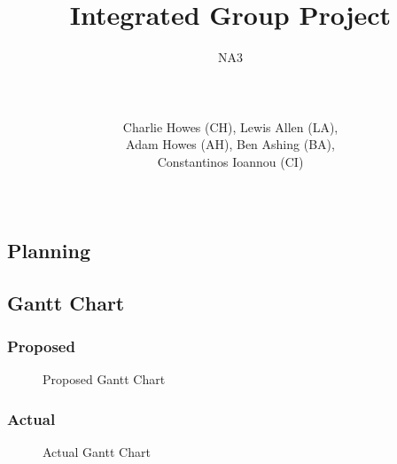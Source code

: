 \documentclass[a4paper]{article}
\title{Integrated Group Project}
\author{NA3
	\\ \rule{5cm}{0.4pt}
	\\Charlie Howes (CH), Lewis Allen (LA), 
    \\Adam Howes (AH), Ben Ashing (BA), 
    \\Constantinos Ioannou (CI)
    \\ \rule{5cm}{0.4pt}
} %
\begin{document}
\maketitle

\tableofcontents

\pagebreak

\begin{landscape} %
\section{Planning}
\subsection{Gantt Chart}
\subsubsection{Proposed}
\begin{figure}[!ht] %
    \centering
    \caption{Proposed Gantt Chart}
    \label{fig:proposed_gantt}
\end{figure}

\clearpage
\subsubsection{Actual} %
\begin{figure}[!ht]
    \centering
    \caption{Actual Gantt Chart}
    \label{fig:actual_gantt}
\end{figure}
\end{landscape}
\end{document}
